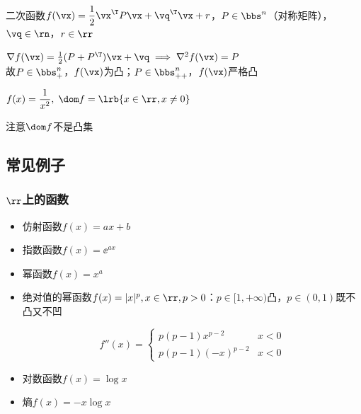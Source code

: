 \begin{example}
二次函数$f(\vx)=\dfrac{1}{2}\vx^\T P\vx+\vq^\T \vx+r$，$P\in \bbs^n$（对称矩阵），$\vq\in\rn$，$r\in\rr$
\end{example}
\begin{analysis}
$\nabla f(\vx)=\frac{1}{2}(P+P^\T)\vx+\vq\implies\nabla^2 f(\vx)=P$\\
故$P\in \bbs^n_+$，$f(\vx)$为凸；$P\in \bbs_{++}^n$，$f(\vx)$严格凸
\end{analysis}

\begin{example}
$f(x)=\dfrac{1}{x^2},\;\dom f=\lrb{x\in\rr,x\ne 0}$
\end{example}
\begin{analysis}
注意$\dom f$不是凸集
\end{analysis}

\subsection{常见例子}
\subsubsection{$\rr$上的函数}
\begin{itemize}
	\item 仿射函数$f(x)=ax+b$
	\item 指数函数$f(x)=\ee^{ax}$
	\item 幂函数$f(x)=x^a$
	\item 绝对值的幂函数$f(x)=|x|^p,x\in\rr,p>0$：$p\in[1,+\infty)$凸，$p\in(0,1)$既不凸又不凹
	\begin{analysis}
	\[f''(x)=\begin{cases}
	p(p-1)x^{p-2} & x<0\\
	p(p-1)(-x)^{p-2} & x<0
	\end{cases}\]
	\end{analysis}
	\item 对数函数$f(x)=\log x$
	\item 熵$f(x)=-x\log x$
\end{itemize}

